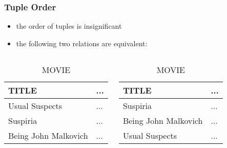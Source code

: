 \documentclass[dvipsnames]{beamer}
\theoremstyle{plain}
\begin{document}
\begin{frame}
  \frametitle{Tuple Order}

  \begin{itemize}
    \item the order of tuples is insignificant
  \end{itemize}

  \pause
  \begin{example}
    \begin{itemize}
      \item the following two relations are equivalent:
    \end{itemize}

    \begin{columns}
      \begin{tiny}
      \begin{table}
        \caption{MOVIE}
        \begin{tabular}{|l|l|}\hline
TITLE                & ...\\\hline\hline
Usual Suspects       & ...\\\hline
Suspiria             & ...\\\hline
Being John Malkovich & ...\\\hline
        \end{tabular}
      \end{table}
      \end{tiny}

      \begin{tiny}
      \begin{table}
        \caption{MOVIE}
        \begin{tabular}{|l|l|}\hline
TITLE                & ...\\\hline\hline
Suspiria             & ...\\\hline
Being John Malkovich & ...\\\hline
Usual Suspects       & ...\\\hline
        \end{tabular}
      \end{table}
      \end{tiny}
    \end{columns}
  \end{example}
\end{frame}
\end{document}

